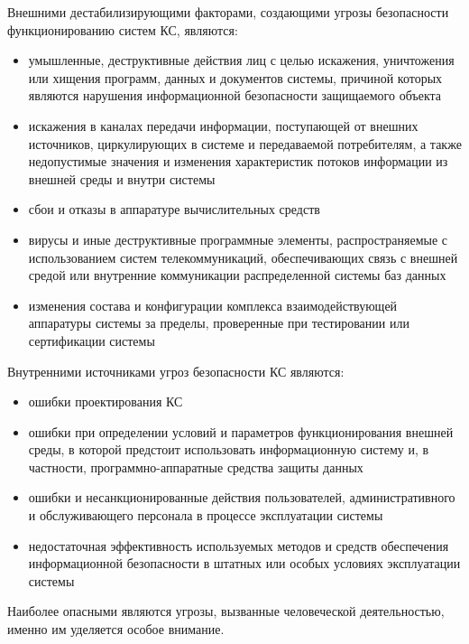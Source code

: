 Внешними дестабилизирующими факторами, создающими угрозы безопасности функционированию систем КС, являются:
\begin{itemize}
	\item умышленные, деструктивные действия лиц с целью искажения, уничтожения или хищения программ, данных и документов системы, причиной которых являются нарушения информационной безопасности защищаемого объекта
	\item искажения в каналах передачи информации, поступающей от внешних источников, циркулирующих в системе и передаваемой потребителям, а также недопустимые значения и изменения характеристик потоков информации из внешней среды и внутри системы~\label{pon:pot}
	\item сбои и отказы в аппаратуре вычислительных средств
	\item вирусы и иные деструктивные программные элементы, распространяемые с использованием систем телекоммуникаций, обеспечивающих связь с внешней средой или внутренние коммуникации распределенной системы баз данных
	\item изменения состава и конфигурации комплекса взаимодействующей аппаратуры системы за пределы, проверенные при тестировании или сертификации системы
\end{itemize}

Внутренними источниками угроз безопасности КС являются:
\begin{itemize}
	\item ошибки проектирования КС
	\item ошибки при определении условий и параметров функционирования внешней среды, в которой предстоит использовать информационную систему и, в частности, программно-аппаратные средства защиты данных
	\item ошибки и несанкционированные действия пользователей, административного и обслуживающего персонала в процессе эксплуатации системы
	\item недостаточная эффективность используемых методов и средств обеспечения информационной безопасности в штатных или особых условиях эксплуатации системы
\end{itemize}

Наиболее опасными являются угрозы, вызванные человеческой деятельностью, именно им уделяется особое внимание.

